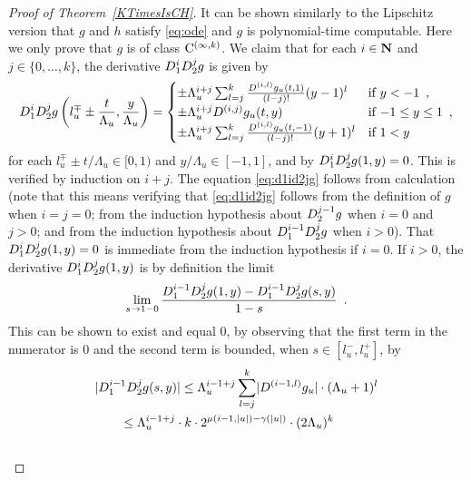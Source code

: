 \begin{proof}[Proof of Theorem~\ref{KTimesIsCH}]
It can be shown similarly to the Lipschitz version 
\cite[Theorem 3.2]{kawamura2010lipschitz}
that $g$ and $h$ satisfy \eqref{eq:ode} and $g$ is polynomial-time computable.
Here we only prove that $g$ is of class $\mathrm C^{(\infty, k)}$.
We claim that 
for each $i \in \mathbf N$ and $j \in \{0, \dots, k\}$, 
the derivative $D _1 ^i D _2 ^j g$ is given by 
\begin{equation}
   D_1^i D_2^j g \left(l^\mp_u \pm \frac{t}{\Lambda_u}, \frac{y}{\Lambda_u}\right)
   = \begin{cases}
      \pm \Lambda_u^{i+j} \sum^{k}_{l=j} \frac{D^{(i,l)} g_u(t,1)}{(l-j)!}
      (y - 1)^l &  \text{if } y < -1 \enspace ,
      \\
      \pm \Lambda_u^{i+j} D^{(i, j)} g_u(t, y) & \text{if } {-1} \le y \le 1 \enspace ,
      \\
      \pm \Lambda_u^{i+j} \sum^{k}_{l=j} 
      \frac{D^{(i,l)} g_u(t, -1)}{(l-j)!} (y + 1)^l &  \text{if } 1<y
    \end{cases}  \label{eq:d1id2jg}
\end{equation}
for each $l_u^\mp \pm t/\Lambda_u \in [0,1)$ and $y/\Lambda_u \in [-1, 1]$, 
and by $D _1 ^i D _2 ^j g (1, y) = 0$. 
This is verified by induction on $i + j$. 
The equation \eqref{eq:d1id2jg} follows from calculation 
(note that this means verifying 
that \eqref{eq:d1id2jg} follows from the definition of $g$ when $i = j = 0$; 
from the induction hypothesis about $D _2 ^{j - 1} g$ when $i = 0$ and $j > 0$; 
and from the induction hypothesis about $D _1 ^{i - 1} D _2 ^j g$ when $i > 0$).
That $D _1 ^i D _2 ^j g (1, y) = 0$ is 
immediate from the induction hypothesis if $i = 0$. 
If $i > 0$, the derivative
$D_1^i D_2^j g (1, y)$ is by definition the limit 
\begin{equation}
\lim_{s \to 1 - 0} \frac{D_1^{i-1} D_2^j g(1, y) - D_1^{i-1} D_2^j g (s, y)}{1 - s} \enspace .
\label{eq:limitofderivative}
\end{equation}
This can be shown to exist and equal $0$, 
by observing that the first term in the numerator is $0$
and the second term is bounded, when $s \in [l ^- _u, l ^+ _u]$, by 
 \begin{align}
&
  \lvert
   \D_1^{i-1} \D_2^j g (s, y)
  \rvert
  \le 
  \Lambda_u^{i-1+j} \sum^{k}_{l=j} \lvert \D^{(i-1,l)} g_u \rvert \cdot (\Lambda_u + 1)^l 
  \notag
\\
& \qquad
 \le
  \Lambda_u^{i-1+j}  \cdot k \cdot 2^{\mu(i-1, |u|) - \gamma(|u|)} \cdot (2\Lambda_u)^k
  \notag
\\
& \qquad

\end{align}
\end{proof}
